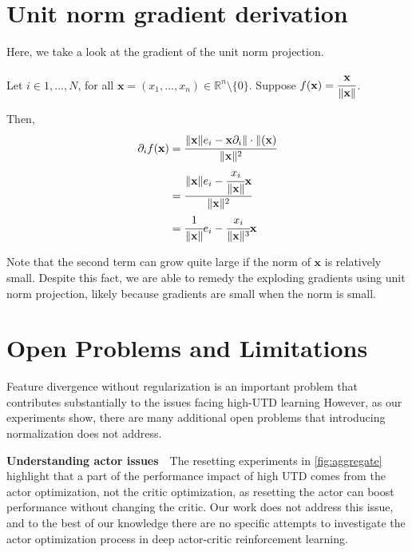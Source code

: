 \section{Unit norm gradient derivation} \label{app:unitnorm}

Here, we take a look at the gradient of the unit norm projection.

Let $i \in {1, ..., N}$, for all $\mathbf{x} = (x_1, ..., x_n) \in \mathbb{R}^n \setminus \{0\}$. Suppose $f(\mathbf{x}) = \cfrac{\mathbf{x}}{\| \mathbf{x} \|}$. 

Then, 
\begin{align*}
    \partial_i f(\mathbf{x}) 
    &= \cfrac{\| \mathbf{x} \| e_i - \mathbf{x} \partial_i \| \cdot \| (\mathbf{x}) }{\|\mathbf{x} \|^2} \\
    &= \cfrac{\| \mathbf{x} \| e_i - \cfrac{x_i}{\|\mathbf{x} \|} \mathbf{x}}{\|\mathbf{x} \|^2} \\
    &= \cfrac{1}{\|\mathbf{x} \|} e_i - \cfrac{x_i}{\|\mathbf{x} \|^3} \mathbf{x}
\end{align*}

Note that the second term can grow quite large if the norm of $\mathbf{x}$ is relatively small. Despite this fact, we are able to remedy the exploding gradients using unit norm projection, likely because gradients are small when the norm is small.

\section{Open Problems and Limitations} \label{app:open}

Feature divergence without regularization is an important problem that contributes substantially to the issues facing high-UTD learning
However, as our experiments show, there are many additional open problems that introducing normalization does not address.

\textbf{Understanding actor issues}~~The resetting experiments in \autoref{fig:aggregate} highlight that a part of the performance impact of high UTD comes from the actor optimization, not the critic optimization, as resetting the actor can boost performance without changing the critic.
Our work does not address this issue, and to the best of our knowledge there are no specific attempts to investigate the actor optimization process in deep actor-critic reinforcement learning.

